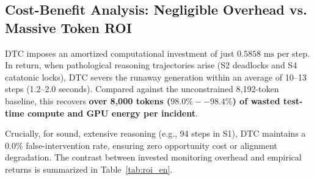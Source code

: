 \documentclass[11pt,a4paper]{article}
\begin{document}
\subsection{Cost-Benefit Analysis: Negligible Overhead vs. Massive Token ROI}

DTC imposes an amortized computational investment of just $0.5858\text{ ms}$ per step. In return, when pathological reasoning trajectories arise (S2 deadlocks and S4 catatonic locks), DTC severs the runaway generation within an average of 10--13 steps (1.2--2.0 seconds). Compared against the unconstrained 8,192-token baseline, this recovers \textbf{over 8,000 tokens ($98.0\%--98.4\%$) of wasted test-time compute and GPU energy per incident}.

Crucially, for sound, extensive reasoning (e.g., 94 steps in S1), DTC maintains a 0.0\% false-intervention rate, ensuring zero opportunity cost or alignment degradation. The contrast between invested monitoring overhead and empirical returns is summarized in Table~\ref{tab:roi_en}.

\begin{table}[htbp]
\centering
\caption{Cost-benefit analysis of monitoring overhead versus token savings ROI}
\label{tab:roi_en}
\small
{}
\end{table}
\end{document}
